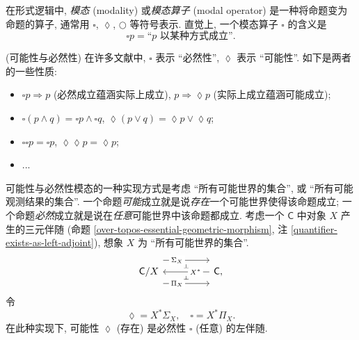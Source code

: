 \label{appendix-modal-logic}

在形式逻辑中, \emph{模态} (modality) 或\emph{模态算子} (modal operator) 是一种将命题变为命题的算子, 通常用 $\square$, $\lozenge$, $\bigcirc$ 等符号表示. 直觉上, 一个模态算子 $\square$ 的含义是
$$\square p = \text{``$p$ 以某种方式成立''}.$$

\begin{example}
	{(可能性与必然性)}
	在许多文献中, $\square$ 表示 ``必然性'', $\lozenge$ 表示 ``可能性''. 如下是两者的一些性质:
	\begin{itemize}
		\item $\square p \Rightarrow p$ (必然成立蕴涵实际上成立), $p\Rightarrow \lozenge p$ (实际上成立蕴涵可能成立);
		\item $\square (p \land q) = \square p \land \square q$, $\lozenge (p\lor q) = \lozenge p \lor \lozenge q$;
		\item $\square\square p = \square p$, $\lozenge\lozenge p =\lozenge p$;
		\item ...
	\end{itemize}
	可能性与必然性模态的一种实现方式是考虑 ``所有可能世界的集合'', 或 ``所有可能观测结果的集合''. 一个命题\emph{可能}成立就是说\emph{存在}一个可能世界使得该命题成立; 一个命题\emph{必然}成立就是说在\emph{任意}可能世界中该命题都成立.
	考虑一个\topos{} $\mathsf C$ 中对象 $X$ 产生的三元伴随 (命题 \ref{over-topos-essential-geometric-morphism}, 注 \ref{quantifier-exists-as-left-adjoint}),
	想象 $X$ 为 ``所有可能世界的集合''.
	\[\begin{tikzcd}[ampersand replacement=\&,background color=\examplecolor]
		{\mathsf C/X} \&\& {\mathsf C,}
		\arrow[""{name=0, anchor=center, inner sep=0}, "{X^*}"{description, pos=0.3}, from=1-3, to=1-1]
		\arrow[""{name=1, anchor=center, inner sep=0}, "{\Sigma_X}"{description, pos=0.3}, shift left=5, from=1-1, to=1-3]
		\arrow[""{name=2, anchor=center, inner sep=0}, "{\Pi_X}"{description, pos=0.3}, shift right=5, from=1-1, to=1-3]
		\arrow["\dashv"{anchor=center, rotate=-90}, draw=none, from=1, to=0]
		\arrow["\dashv"{anchor=center, rotate=-90}, draw=none, from=0, to=2]
	\end{tikzcd}\]
	令
	$$
	\lozenge = X^*\Sigma_X,\quad
	\square = X^*\Pi_X.
	$$
	在此种实现下, 可能性 $\lozenge$ (存在) 是必然性 $\square$ (任意) 的左伴随.
\end{example}